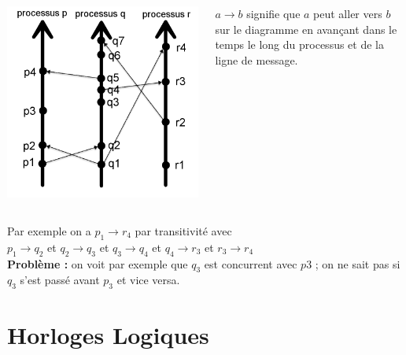 \documentclass[compress]{beamer}
\begin{document}
\begin{frame}
  \begin{columns}
    \begin{column}{.5\textwidth}
    \begin{block}{}
		\includegraphics[scale=0.15]{process2.png}
    \end{block}
    \end{column}
	\begin{column}{0.5 \textwidth}
	\begin{block}{}
		$a \rightarrow b$ signifie que $a$ peut aller vers $b$ sur le diagramme en avançant dans le temps le long du processus et de la ligne de message.
		\end{block}
	\end{column}
	\end{columns}
	Par exemple on a $p_1 \rightarrow r_4$  par transitivité avec \\
	$p_1 \rightarrow q_2$ et $q_2 \rightarrow q_3$ et $q_3 \rightarrow q_4$ et $q_4 \rightarrow r_3$ et $r_3 \rightarrow r_4$\\
	\textbf{{\color{red}Problème : }}on voit par exemple que $q_3$ est concurrent avec $p3$ ; on ne sait pas si $q_3$ s'est passé avant $p_3$ et vice versa.
\end{frame}

\section{Horloges Logiques}
\end{document}
